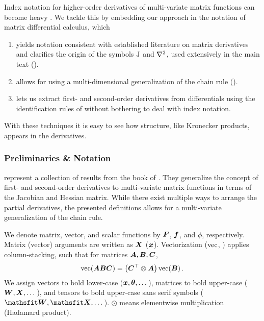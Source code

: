 Index notation for higher-order derivatives of multi-variate matrix functions
can become heavy
\citep{mizutani2008secondorder,naumov2017HessianInMatrixForm,wei2018bdapch,bakker2018OuterProductStructure}.
We tackle this by embedding our approach in the notation of matrix differential
calculus, which
\begin{enumerate}
\item yields notation consistent with established literature on matrix
  derivatives \citep{magnus1999MatrixDifferentialCalculus} and clarifies the
  origin of the symbols $\jac$ and $\gradsquared{}$, used extensively in the
  main text
  ().

\item allows for using a multi-dimensional generalization of the chain rule
  ().

\item lets us extract first- and second-order derivatives from differentials
  using the identification rules of \citet{magnus1999MatrixDifferentialCalculus}
  without bothering to deal with index notation.
\end{enumerate}
With these techniques it is easy to see how structure, like Kronecker products,
appears in the derivatives.

\subsubsection{Preliminaries \& Notation}

represent a collection of results from the book of
\citet{magnus1999MatrixDifferentialCalculus}. They generalize the concept of
first- and second-order derivatives to multi-variate matrix functions in terms
of the Jacobian and Hessian matrix. While there exist multiple ways to arrange
the partial derivatives, the presented definitions allows for a multi-variate
generalization of the chain rule.

We denote matrix, vector, and scalar functions by $\mF$, $\vf$, and $\phi$,
respectively. Matrix (vector) arguments are written as $\mX$ ($\vx$).
Vectorization ($\vec$, ) applies
column-stacking, such that for matrices $\mA, \mB, \mC$,
\begin{align}
  \label{hbp::equ:vectorization}
  \vec(\mA\mB\mC) = \left( \mC^\top \otimes \mA \right) \vec(\mB)\,.
\end{align}
We assign vectors to bold lower-case ($\vx, \vtheta, \dots$), matrices to bold
upper-case ($\mW, \mX, \dots$), and tensors to bold upper-case sans serif
symbols ($\tW, \tX, \dots$). $\odot$ means elementwise multiplication (Hadamard
product).

